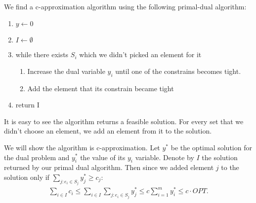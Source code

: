 \documentclass{article}
\begin{document}
\begin{enumerate}
We find a c-approximation algorithm using the following primal-dual algorithm:
\begin{enumerate}
    \item $y \gets $0
    \item $I \leftarrow \emptyset$
    \item while there exists $S_i$ which we didn't picked an element for it
    \begin{enumerate}
        \item Increase the dual variable $y_i$ until one of the constrains becomes tight.
        \item Add the element that its constrain became tight
    \end{enumerate}
    \item return I
\end{enumerate}

It is easy to see the algorithm returns a feasible solution. For every set that we didn't choose an element, we add an element from it to the solution.

We will show the algorithm is c-approximation. Let $y^*$ be the optimal solution for the dual problem and $y^*_i$ the value of its $y_i$ variable. Denote by $I$ the solution returned by our primal dual algorithm. Then since we added element $j$ to the solution  only if $\sum_{j : e_i \in S_j} y^*_j \geq c_j$:
\begin{align*}
    \sum_{i \in I} c_i \leq \sum_{i \in I} \sum_{j : e_i \in S_j} y^*_j \leq c \sum_{i=1}^{m} y^*_i \leq c \cdot OPT.
\end{align*}
\end{enumerate}
\end{document}
